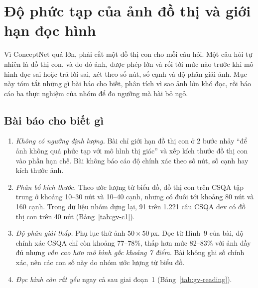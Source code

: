 \begin{table}[t]
\centering
\caption{Độ chính xác (\%, khớp tuyệt đối) trên sáu tác vụ đọc ảnh đồ thị, do tác giả công bố}
\label{tab:gv-reading}
\small
\setlength{\tabcolsep}{3pt}
\end{table}

\section{Độ phức tạp của ảnh đồ thị và giới hạn đọc hình}\label{sec:gv-complexity}
Vì ConceptNet quá lớn, \GV{} phải cắt một đồ thị con cho mỗi câu hỏi. Một câu hỏi tự nhiên là đồ thị con, và do đó ảnh, được phép lớn và rối tới mức nào trước khi mô hình đọc sai hoặc trả lời sai, xét theo số nút, số cạnh và độ phân giải ảnh. Mục này tóm tắt những gì bài báo cho biết, phân tích vì sao ảnh lớn khó đọc, rồi báo cáo ba thực nghiệm của nhóm để đo ngưỡng mà bài bỏ ngỏ.

\subsection{Bài báo cho biết gì}
\begin{enumerate}
\item \emph{Không có ngưỡng định lượng.} Bài chỉ giới hạn đồ thị con ở 2 bước nhảy ``để ảnh không quá phức tạp với mô hình thị giác'' và xếp kích thước đồ thị con vào phần hạn chế. Bài không báo cáo độ chính xác theo số nút, số cạnh hay kích thước ảnh.
\item \emph{Phân bố kích thước.} Theo ước lượng từ biểu đồ, đồ thị con trên CSQA tập trung ở khoảng 10--30 nút và 10--40 cạnh, nhưng có đuôi tới khoảng 80 nút và 160 cạnh. Trong dữ liệu nhóm dựng lại, 91 trên 1.221 câu CSQA dev có đồ thị con trên 40 nút (Bảng~\ref{tab:gv-c1}).
\item \emph{Độ phân giải thấp.} Phụ lục thử ảnh $50\times50$\,px. Đọc từ Hình~9 của bài, độ chính xác CSQA chỉ còn khoảng 77--78\%, thấp hơn mức 82--83\% với ảnh đầy đủ nhưng \emph{vẫn cao hơn mô hình gốc khoảng 7 điểm}. Bài không ghi số chính xác, nên các con số này do nhóm ước lượng từ biểu đồ.
\item \emph{Đọc hình còn rất yếu} ngay cả sau giai đoạn~1 (Bảng~\ref{tab:gv-reading}).
\end{enumerate}

